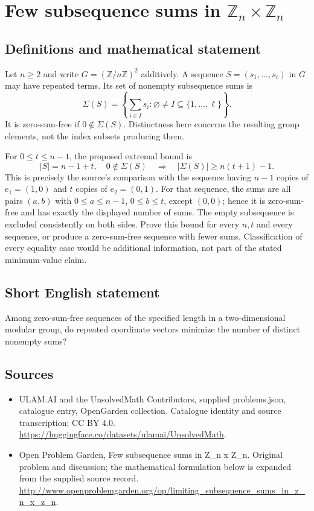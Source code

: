 \documentclass[11pt,a4paper]{article}
\begin{document}
\section*{Few subsequence sums in $\mathbb Z_n\times\mathbb Z_n$}\label{statement}

\subsection{Definitions and mathematical statement}
Let $n\ge2$ and write $G=(\mathbb Z/n\mathbb Z)^2$ additively.
A sequence $S=(s_1,\ldots,s_\ell)$ in $G$ may have repeated terms.
Its set of nonempty subsequence sums is
\[
 \Sigma(S)=\left\{\sum_{i\in I}s_i:
                  \varnothing\ne I\subseteq\{1,\ldots,\ell\}\right\}.
\]
It is zero-sum-free if $0\notin\Sigma(S)$. Distinctness here concerns
the resulting group elements, not the index subsets producing them.

For $0\le t\le n-1$, the proposed extremal bound is
\[
 |S|=n-1+t,\quad 0\notin\Sigma(S)
           \quad\Longrightarrow\quad |\Sigma(S)|\ge n(t+1)-1.
\]
This is precisely the source's comparison with the sequence having
$n-1$ copies of $e_1=(1,0)$ and $t$ copies of $e_2=(0,1)$.
For that sequence, the sums are all pairs $(a,b)$ with
$0\le a\le n-1$, $0\le b\le t$, except $(0,0)$; hence it is
zero-sum-free and has exactly the displayed number of sums.
The empty subsequence is excluded consistently on both sides.
Prove this bound for every $n,t$ and every sequence, or produce a
zero-sum-free sequence with fewer sums. Classification of every
equality case would be additional information, not part of the stated
minimum-value claim.
\subsection{Short English statement}
Among zero-sum-free sequences of the specified length in a two-dimensional modular group, do repeated coordinate vectors minimize the number of distinct nonempty sums?
\subsection{Sources}
\begin{itemize}
\item[S1] ULAM.AI and the UnsolvedMath Contributors, supplied problems.json, catalogue entry, OpenGarden collection. Catalogue identity and source transcription; CC BY 4.0.
\url{https://huggingface.co/datasets/ulamai/UnsolvedMath}.
\item[S2] Open Problem Garden, Few subsequence sums in Z\_n x Z\_n. Original problem and discussion; the mathematical formulation below is expanded from the supplied source record.
\url{http://www.openproblemgarden.org/op/limiting_subsequence_sums_in_z_n_x_z_n}.
\end{itemize}
\end{document}
